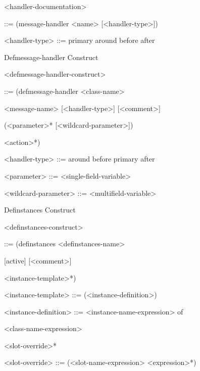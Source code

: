 \documentclass[letterpaper,10pt,english]{sphinxmanual}
\begin{document}
\textless{}handler-documentation\textgreater{}

::= (message-handler \textless{}name\textgreater{} {[}\textless{}handler-type\textgreater{}{]})

\textless{}handler-type\textgreater{} ::= primary \textbar{} around \textbar{} before \textbar{} after

Defmessage-handler Construct

\textless{}defmessage-handler-construct\textgreater{}

::= (defmessage-handler \textless{}class-name\textgreater{}

\textless{}message-name\textgreater{} {[}\textless{}handler-type\textgreater{}{]} {[}\textless{}comment\textgreater{}{]}

(\textless{}parameter\textgreater{}* {[}\textless{}wildcard-parameter\textgreater{}{]})

\textless{}action\textgreater{}*)

\textless{}handler-type\textgreater{} ::= around \textbar{} before \textbar{} primary \textbar{} after

\textless{}parameter\textgreater{} ::= \textless{}single-field-variable\textgreater{}

\textless{}wildcard-parameter\textgreater{} ::= \textless{}multifield-variable\textgreater{}

Definstances Construct

\textless{}definstances-construct\textgreater{}

::= (definstances \textless{}definstances-name\textgreater{}

{[}active{]} {[}\textless{}comment\textgreater{}{]}

\textless{}instance-template\textgreater{}*)

\textless{}instance-template\textgreater{} ::= (\textless{}instance-definition\textgreater{})

\begin{DUlineblock}{0em}
\item[] \textless{}instance-definition\textgreater{} ::= \textless{}instance-name-expression\textgreater{} of
\item[] \textless{}class-name-expression\textgreater{}
\item[] \textless{}slot-override\textgreater{}*
\end{DUlineblock}

\textless{}slot-override\textgreater{} ::= (\textless{}slot-name-expression\textgreater{} \textless{}expression\textgreater{}*)
\end{document}
